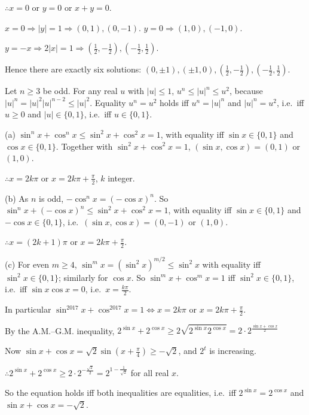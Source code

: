   $\therefore x = 0$ or $y = 0$ or $x + y = 0$.

  $x = 0\Rightarrow |y| = 1\Rightarrow (0, 1), (0, -1)$. $y = 0\Rightarrow (1, 0), (-1, 0)$.

  $y = -x\Rightarrow 2|x| = 1\Rightarrow\left(\frac{1}{2}, -\frac{1}{2}\right), \left(-\frac{1}{2},
  \frac{1}{2}\right)$.

  Hence there are exactly six solutions: $(0, \pm1), (\pm1, 0), \left(\frac{1}{2}, -\frac{1}{2}\right),
  \left(-\frac{1}{2}, \frac{1}{2}\right)$.
\item Let $n\ge 3$ be odd. For any real $u$ with $|u|\le 1$, $u^n\le|u|^n\le u^2$, because $|u|^n = |u|^2|u|^{n
  - 2}\le|u|^2$. Equality $u^n = u^2$ holds iff $u^n = |u|^n$ and $|u|^n = u^2$, i.e.\ iff $u\ge 0$ and $|u|\in\{0,
  1\}$, i.e.\ iff $u\in\{0, 1\}$.

  (a) $\sin^nx + \cos^nx\le\sin^2x + \cos^2x = 1$, with equality iff $\sin x\in\{0, 1\}$ and $\cos x\in\{0,
  1\}$. Together with $\sin^2x + \cos^2x = 1$, $(\sin x, \cos x) = (0, 1)$ or $(1, 0)$.

  $\therefore x = 2k\pi$ or $x = 2k\pi + \frac{\pi}{2}$, $k$ integer.

  (b) As $n$ is odd, $-\cos^nx = (-\cos x)^n$. So $\sin^nx + (-\cos x)^n\le\sin^2x + \cos^2x = 1$, with equality
  iff $\sin x\in\{0, 1\}$ and $-\cos x\in\{0, 1\}$, i.e.\ $(\sin x, \cos x) = (0, -1)$ or $(1, 0)$.

  $\therefore x = (2k + 1)\pi$ or $x = 2k\pi + \frac{\pi}{2}$.

  (c) For even $m\ge 4$, $\sin^mx = (\sin^2x)^{m/2}\le\sin^2x$ with equality iff $\sin^2x\in\{0, 1\}$; similarly
  for $\cos x$. So $\sin^mx + \cos^mx = 1$ iff $\sin^2x\in\{0, 1\}$, i.e.\ iff $\sin x\cos x = 0$, i.e.\ $x =
  \frac{k\pi}{2}$.

  In particular $\sin^{2017}x + \cos^{2017}x = 1\Leftrightarrow x = 2k\pi$ or $x = 2k\pi + \frac{\pi}{2}$.
\item By the A.M.--G.M. inequality, $2^{\sin x} + 2^{\cos x}\ge 2\sqrt{2^{\sin x}2^{\cos x}} = 2\cdot2^{\frac{\sin
  x + \cos x}{2}}$

  Now $\sin x + \cos x = \sqrt{2}\sin\left(x + \frac{\pi}{4}\right)\ge -\sqrt{2}$, and $2^t$ is increasing.

  $\therefore 2^{\sin x} + 2^{\cos x}\ge 2\cdot2^{-\frac{\sqrt{2}}{2}} = 2^{1 - \frac{1}{\sqrt{2}}}$ for all real
  $x$.

  So the equation holds iff both inequalities are equalities, i.e.\ iff $2^{\sin x} = 2^{\cos x}$ and $\sin x +
  \cos x = -\sqrt{2}$.

